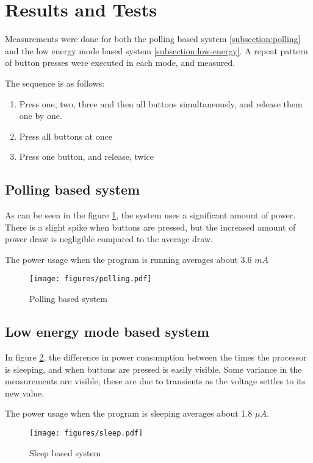 \section{Results and Tests}

Measurements were done for both the polling based system \ref{subsection:polling} and the low energy mode based system \ref{subsection:low-energy}. A repeat pattern of button presses were executed in each mode, and measured.

The sequence is as follows:
\begin{enumerate}
\item
	Press one, two, three and then all buttons simultaneously, and release them one by one.
\item
	Press all buttons at once
\item
	Press one button, and release, twice
\end{enumerate}

\subsection{Polling based system}

As can be seen in the figure \ref{fig:polling-based-system}, the system uses a significant amount of power.
There is a slight spike when buttons are pressed, but the increased amount of power draw is negligible compared to the average draw.

The power usage when the program is running averages about 3.6 $mA$

\begin{figure}[h]
\centering
\texttt{[image: figures/polling.pdf]}
\caption{Polling based system}
\label{fig:polling-based-system}
\end{figure}

\subsection{Low energy mode based system}
In figure \ref{fig:sleep-based-system}, the difference in power consumption between the times the processor is sleeping, and when buttons are pressed is easily visible.
Some variance in the measurements are visible, these are due to transients as the voltage settles to its new value.

The power usage when the program is sleeping averages about 1.8 ${\mu}A$.

\begin{figure}[h]
\centering
\texttt{[image: figures/sleep.pdf]}
\caption{Sleep based system}
\label{fig:sleep-based-system}
\end{figure}

